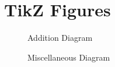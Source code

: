 \section{TikZ Figures}

\begin{figure}[H]
    \centering
    \caption{Addition Diagram}
    
    \label{fig:add}
\end{figure}

\begin{figure}[H]
    \centering
    \caption{Miscellaneous Diagram}
    
    \label{fig:misc}
\end{figure}